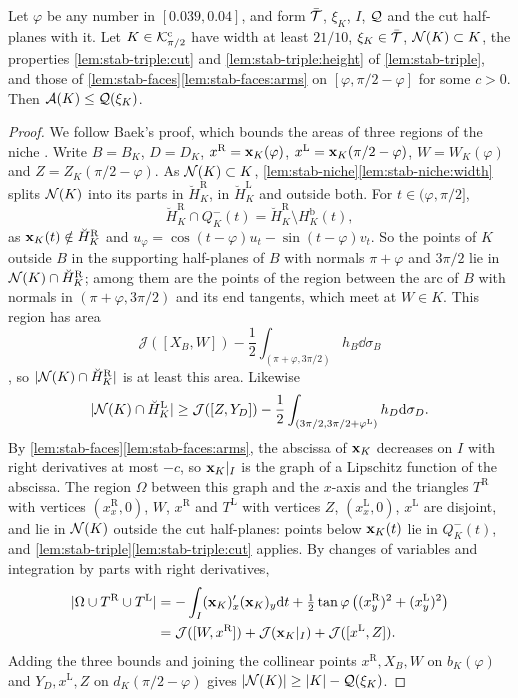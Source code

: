 \begin{lemma}\label{lem:stab-areabound}
Let $\varphi$ be any number in $[0.039,0.04]$, and form $\bar{\mathcal{T}}$, $\xi_K$,
$I$, $\mathcal{Q}$ and the cut half-planes with it. Let $K\in\mathcal{K}^{\mathrm{c}}_{\pi/2}$ have width
at least $21/10$, $\xi_K\in\bar{\mathcal{T}}$, $\mathcal{N}(K)\subset K$, the properties
\ref{lem:stab-triple:cut} and \ref{lem:stab-triple:height} of
\cref{lem:stab-triple}, and those of
\cref{lem:stab-faces}\ref{lem:stab-faces:arms} on $[\varphi,\pi/2-\varphi]$
for some $c>0$. Then $\mathcal{A}(K)\le\mathcal{Q}(\xi_K)$.
\end{lemma}

\begin{proof}
We follow Baek's proof, which bounds the areas of three regions of the niche
. Write $B=B_K$, $D=D_K$,
$x^{\mathrm R}=\mathbf{x}_K(\varphi)$, $x^{\mathrm L}=\mathbf{x}_K(\pi/2-\varphi)$,
$W=W_K(\varphi)$ and $Z=Z_K(\pi/2-\varphi)$. As $\mathcal{N}(K)\subset K$,
\cref{lem:stab-niche}\ref{lem:stab-niche:width} splits $\mathcal{N}(K)$ into its parts
in $\breve H^{\mathrm R}_K$, in $\breve H^{\mathrm L}_K$ and outside both. For
$t\in(\varphi,\pi/2]$,
\[
  \breve H^{\mathrm R}_K\cap Q^-_K(t)=\breve H^{\mathrm R}_K\setminus
  H^{\mathrm b}_K(t),
\]
as $\mathbf{x}_K(t)\notin\breve H^{\mathrm R}_K$ and
$u_\varphi=\cos(t-\varphi)u_t-\sin(t-\varphi)v_t$. So the points of $K$
outside $B$ in the supporting half-planes of $B$ with normals $\pi+\varphi$
and $3\pi/2$ lie in $\mathcal{N}(K)\cap\breve H^{\mathrm R}_K$; among them are the
points of the region between the arc of $B$ with normals in
$(\pi+\varphi,3\pi/2)$ and its end tangents, which meet at $W\in K$. This
region has area
\[
  \mathcal J([X_B,W])-\frac12\int_{(\pi+\varphi,3\pi/2)}h_B\dd\sigma_B
\]
, so $\lvert \mathcal{N}(K)\cap\breve H^{\mathrm R}_K\rvert$ is at least
this area. Likewise
\[
  \lvert \mathcal{N}(K)\cap\breve H^{\mathrm L}_K\rvert\ge\mathcal J([Z,Y_D])
  -\frac12\int_{(3\pi/2,3\pi/2+\varphi^{\mathrm L})}h_D\mathrm{d}\sigma_D.
\]
By \cref{lem:stab-faces}\ref{lem:stab-faces:arms}, the abscissa of $\mathbf{x}_K$
decreases on $I$ with right derivatives at most $-c$, so $\mathbf{x}_K|_I$ is the
graph of a Lipschitz function of the abscissa. The region $\Omega$ between this
graph and the $x$-axis and the triangles $T^{\mathrm R}$ with vertices
$(x^{\mathrm R}_x,0)$, $W$, $x^{\mathrm R}$ and $T^{\mathrm L}$ with vertices
$Z$, $(x^{\mathrm L}_x,0)$, $x^{\mathrm L}$ are disjoint, and lie in $\mathcal{N}(K)$
outside the cut half-planes: points below $\mathbf{x}_K(t)$ lie in $Q^-_K(t)$, and
\cref{lem:stab-triple}\ref{lem:stab-triple:cut} applies. By changes of
variables and integration by parts with right derivatives,
\begin{align*}
  \lvert \Omega\cup T^{\mathrm R}\cup T^{\mathrm L}\rvert
  &=-\int_I(\mathbf{x}_K)'_x(\mathbf{x}_K)_y\mathrm{d} t+\tfrac12\tan\varphi\,
    \bigl((x^{\mathrm R}_y)^2+(x^{\mathrm L}_y)^2\bigr)\\
  &=\mathcal J([W,x^{\mathrm R}])+\mathcal J(\mathbf{x}_K|_I)
    +\mathcal J([x^{\mathrm L},Z]).
\end{align*}
Adding the three bounds and joining the collinear points
$x^{\mathrm R},X_B,W$ on $b_K(\varphi)$ and $Y_D,x^{\mathrm L},Z$ on
$d_K(\pi/2-\varphi)$ gives $\lvert \mathcal{N}(K)\rvert\ge\lvert K\rvert-\mathcal{Q}(\xi_K)$.
\end{proof}

